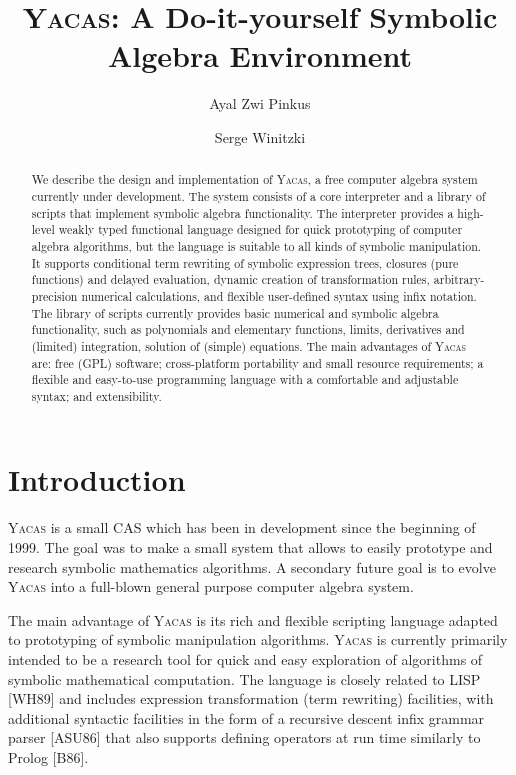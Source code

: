 \documentclass{llncs}
\begin{document}
\title{\textsc{Yacas}: A Do-it-yourself Symbolic Algebra Environment}

\author{Ayal Zwi Pinkus \and Serge Winitzki}

\maketitle

\begin{abstract}
We describe the design and implementation of \textsc{Yacas}, a free computer
algebra system currently under development.  The system consists of a core
interpreter and a library of scripts that implement symbolic algebra
functionality.  The interpreter provides a high-level weakly typed functional
language designed for quick prototyping of computer algebra algorithms, but the
language is suitable to all kinds of symbolic manipulation. It supports
conditional term rewriting of symbolic expression trees, closures (pure
functions) and delayed evaluation, dynamic creation of transformation rules,
arbitrary-precision numerical calculations, and flexible user-defined syntax
using infix notation.  The library of scripts currently provides basic
numerical and symbolic algebra functionality, such as polynomials and
elementary functions, limits, derivatives and (limited) integration, solution
of (simple) equations. The main advantages of \textsc{Yacas} are: free (GPL)
software; cross-platform portability and small resource requirements; a
flexible and easy-to-use programming language with a comfortable and adjustable
syntax; and extensibility.
\end{abstract}



\section{Introduction}
\textsc{Yacas} is a small CAS which has been in development since the beginning of 1999.
The goal was to make a small system that allows to easily prototype and
research symbolic mathematics algorithms. A secondary future goal is to evolve
\textsc{Yacas} into a full-blown general purpose computer algebra system.


The main advantage of \textsc{Yacas} is its rich and  flexible scripting language
adapted to prototyping of symbolic manipulation algorithms. \textsc{Yacas} is currently
primarily intended to be a research tool for quick and easy exploration of
algorithms of symbolic mathematical computation. The language is closely
related to LISP [WH89] and includes expression transformation (term rewriting)
facilities, with additional syntactic facilities in the form of a recursive
descent infix grammar parser [ASU86]  that also supports defining operators at
run time similarly to Prolog [B86].
\end{document}
